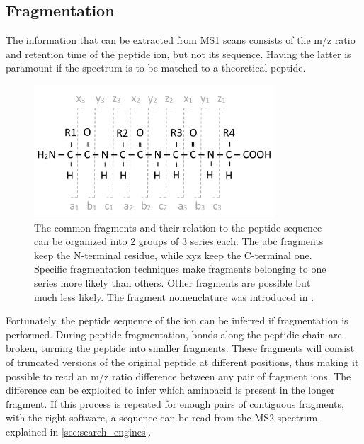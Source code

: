 \documentclass[11pt, a4paper]{report}
\begin{document}
\subsection{Fragmentation}
\label{subsec:fragmentation}

The information that can be extracted from \ac{MS1} scans consists of the \ac{m/z} ratio and retention time of the peptide ion, but not its sequence. Having the latter is paramount if the spectrum is to be matched to a theoretical peptide.

\begin{figure}[!h]
\centering
\includegraphics[width=0.8\textwidth]{abcxyz}
\caption{The common fragments and their relation to the peptide sequence can be organized into 2 groups of 3 series each. The abc fragments keep the N-terminal residue, while xyz keep the C-terminal one. Specific fragmentation techniques make fragments belonging to one series more likely than others. Other fragments are possible but much less likely. The fragment nomenclature was introduced in \cite{Roepstorff1984}.}
\label{fig:abcxyz}
\end{figure}


Fortunately, the peptide sequence of the ion can be inferred if fragmentation is performed. During peptide fragmentation, bonds along the peptidic chain are broken, turning the peptide into smaller fragments. These fragments will consist of truncated versions of the original peptide at different positions, thus making it possible to read an \ac{m/z} ratio difference between any pair of fragment ions. The difference can be exploited to infer which aminoacid is present in the longer fragment. If this process is repeated for enough pairs of contiguous fragments, with the right software, a sequence can be read from the \ac{MS2} spectrum.  explained in \ref{sec:search_engines}.

\end{document}
